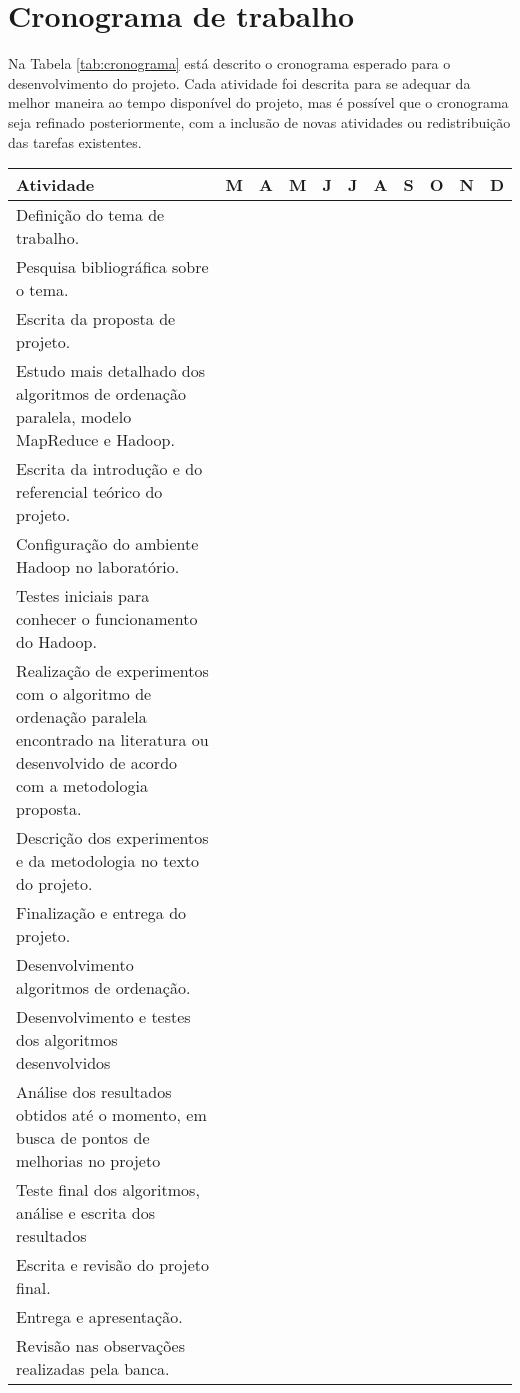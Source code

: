 \section{Cronograma de trabalho}

Na Tabela \ref{tab:cronograma} está descrito o cronograma esperado para o desenvolvimento do projeto. Cada atividade foi descrita para se adequar da melhor maneira ao tempo disponível do projeto, mas é possível que o cronograma seja refinado posteriormente, com a inclusão de novas atividades ou redistribuição das tarefas existentes. 

\begin{table}[h]
\begin{center}
\renewcommand{\arraystretch}{1.5}
\setlength\tabcolsep{3pt}

\begin{tabular}{| p{8cm} | p{0.5cm} | p{0.5cm} | p{0.5cm} | p{0.5cm} | p{0.5cm} | p{0.5cm} | p{0.5cm} | p{0.5cm} | p{0.5cm} | p{0.5cm} |}
\hline
Atividade &M &A &M &J &J &A &S &O &N &D \\ \hline \hline
Definição do tema de trabalho. & & & & & & & & & & \\ \hline
Pesquisa bibliográfica sobre o tema.  & & & & & & & & & &\\ \hline
Escrita da proposta de projeto.  & & & & & & & & & & \\ \hline
Estudo mais detalhado dos algoritmos de ordenação paralela,  modelo MapReduce e Hadoop.  & & & & & & & & & &\\ \hline
Escrita da introdução e do referencial teórico do projeto.  & & & & & & & & & &\\ \hline
Configuração do ambiente Hadoop no laboratório.  & & & & & & & & & &\\ \hline
Testes iniciais para conhecer o funcionamento do Hadoop.  & & & & & & & & & &\\ \hline
Realização de experimentos com o algoritmo de ordenação paralela encontrado na literatura ou desenvolvido de acordo com a metodologia proposta.  & & & & & & & & & &\\ \hline
Descrição dos experimentos e da metodologia no texto do projeto.  & & & & & & & & & & \\ \hline
Finalização e entrega do projeto.  & & & & & & & & & &\\ \hline
Desenvolvimento  algoritmos de ordenação. & & & & & & & & & & \\ \hline
Desenvolvimento e testes dos algoritmos desenvolvidos  & & & & & & & & & & \\ \hline
Análise dos resultados obtidos até o momento, em busca de pontos de melhorias no projeto  & & & & & & & & & & \\ \hline
Teste final dos algoritmos, análise e escrita dos resultados  & & & & & & & & & & \\ \hline
Escrita e revisão do projeto final.  & & & & & & & & & &\\ \hline
Entrega e apresentação.  & & & & & & & & & & \\ \hline
Revisão nas observações realizadas pela banca.  & & & & & & & & & &\\ \hline
\hline
\end{tabular}


\end{center}
\end{table}

